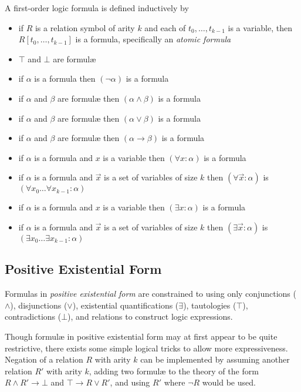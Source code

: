 		A first-order logic formula is defined inductively by
		\begin{itemize}
		\item if $R$ is a relation symbol of arity $k$ and each of $t_0 , \ldots , t_{k-1}$ is a variable, then $R[t_0,\ldots,t_{k-1}]$ is a formula, specifically an \emph{atomic formula}
		\item $\top$ and $\bot$ are formul{\ae}
		\item if $\alpha$ is a formula then $(\neg\alpha)$ is a formula
		\item if $\alpha$ and $\beta$ are formul{\ae} then $(\alpha\wedge\beta)$ is a formula
		\item if $\alpha$ and $\beta$ are formul{\ae} then $(\alpha\vee\beta)$ is a formula
		\item if $\alpha$ and $\beta$ are formul{\ae} then $(\alpha\to\beta)$ is a formula
		\item if $\alpha$ is a formula and $x$ is a variable then $(\forall x : \alpha)$ is a formula
		\item if $\alpha$ is a formula and $\vec{x}$ is a set of variables of size $k$ then $(\forall \vec{x} : \alpha)$ is $(\forall x_0 \ldots \forall x_{k-1} : \alpha)$
		\item if $\alpha$ is a formula and $x$ is a variable then $(\exists x : \alpha)$ is a formula
		\item if $\alpha$ is a formula and $\vec{x}$ is a set of variables of size $k$ then $(\exists \vec{x} : \alpha)$ is $(\exists x_0 \ldots \exists x_{k-1} : \alpha)$
		\end{itemize}

	\subsection{Positive Existential Form}

		Formulas in \emph{positive existential form} are constrained to using
		only conjunctions ($\wedge$), disjunctions ($\vee$), existential
		quantifications ($\exists$), tautologies ($\top$), contradictions
		($\bot$), and relations to construct logic expressions.

		Though formul{\ae} in positive existential form may at first appear to
		be quite restrictive, there exists some simple logical tricks to allow
		more expressiveness. Negation of a relation $R$ with arity $k$ can be
		implemented by assuming another relation $R'$ with arity $k$, adding
		two formul{\ae} to the theory of the form $R \wedge R' \to \bot$ and
		$\top \to R \vee R'$, and using $R'$ where $\neg R$ would be used.


